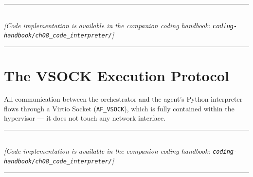 \begin{center}
\noindent\rule{0.6\textwidth}{0.4pt} \\
\vspace{0.3em}
\textit{[Code implementation is available in the companion coding handbook: \texttt{coding-handbook/ch08\_code\_interpreter/}]} \\
\noindent\rule{0.6\textwidth}{0.4pt}
\end{center}


\section{The VSOCK Execution Protocol}

All communication between the orchestrator and the agent's Python interpreter flows through a Virtio Socket (\texttt{AF\_VSOCK}), which is fully contained within the hypervisor — it does not touch any network interface.


\begin{center}
\noindent\rule{0.6\textwidth}{0.4pt} \\
\vspace{0.3em}
\textit{[Code implementation is available in the companion coding handbook: \texttt{coding-handbook/ch08\_code\_interpreter/}]} \\
\noindent\rule{0.6\textwidth}{0.4pt}
\end{center}

